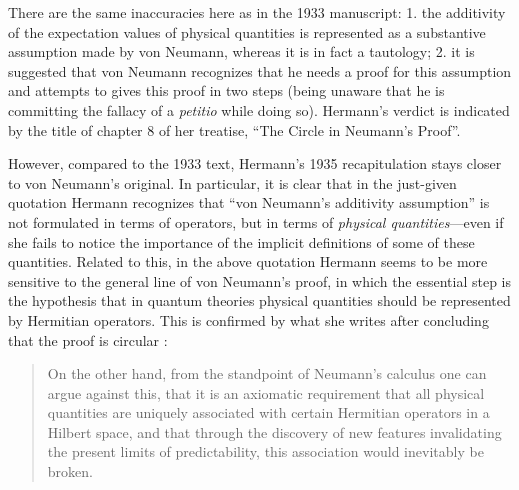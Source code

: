\documentclass[11pt]{article}
\begin{document}
There are the same inaccuracies here as in the 1933 manuscript: 1. the additivity of the expectation values of physical quantities is represented as a substantive assumption made by von Neumann, whereas it is in fact a tautology; 2. it is suggested that von Neumann recognizes that he needs a proof for this assumption and attempts to gives this proof in two steps (being unaware that he is committing the fallacy of a \emph{petitio} while doing so). Hermann's verdict is indicated by the title of chapter 8 of her treatise, ``The Circle in Neumann's Proof''.

However, compared to the 1933 text, Hermann's 1935 recapitulation stays closer to von Neumann's original. In particular, it is clear that in the just-given quotation Hermann recognizes that ``von Neumann's additivity assumption'' is not formulated in terms of operators, but in terms of \emph{physical quantities}---even if she fails to notice the importance of the implicit definitions of some of these quantities. Related to this, in the above quotation Hermann seems to be more sensitive to the general line of von Neumann's proof, in which the essential step is the hypothesis that in quantum theories physical quantities should be represented by Hermitian operators. This is confirmed by what she writes after concluding that the proof is circular \cite[p.\@ 269]{crull}:
\begin{quote}
On the other hand, from the standpoint of Neumann's calculus one can argue
against this, that it is an axiomatic requirement that all physical
quantities are uniquely associated with certain Hermitian operators in a Hilbert
space, and that through the discovery of new features invalidating the present limits
of predictability, this association would inevitably be broken.
\end{quote}
\end{document}
